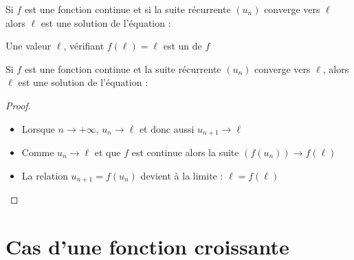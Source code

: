 \begin{frame}

\begin{proposition}
\label{prop:fll}
Si $f$ est une fonction continue
et si la suite récurrente $(u_n)$ converge vers $\ell$
alors $\ell$ est une solution de l'équation :
\end{proposition}

\pause

Une valeur $\ell$, vérifiant $f(\ell)=\ell$ est un  de $f$



\end{frame}



\begin{frame}
\begin{proposition}
\label{prop:fll}
Si $f$ est une fonction continue et la suite récurrente $(u_n)$ converge vers $\ell$, alors
$\ell$ est une solution de l'équation :
\end{proposition}


\begin{proof}
\pause
\begin{itemize}
  \item Lorsque $n\to +\infty$, $u_n\to \ell$ et donc aussi $u_{n+1} \to \ell$
\pause  
  \item Comme $u_n\to \ell$ et que $f$ est continue alors la suite $(f(u_n)) \to f(\ell)$
\pause  
  \item La relation $u_{n+1} = f(u_n)$ devient à la limite : $\ell=f(\ell)$
\end{itemize}

\end{proof}
\end{frame}




\section{Cas d'une fonction croissante}


